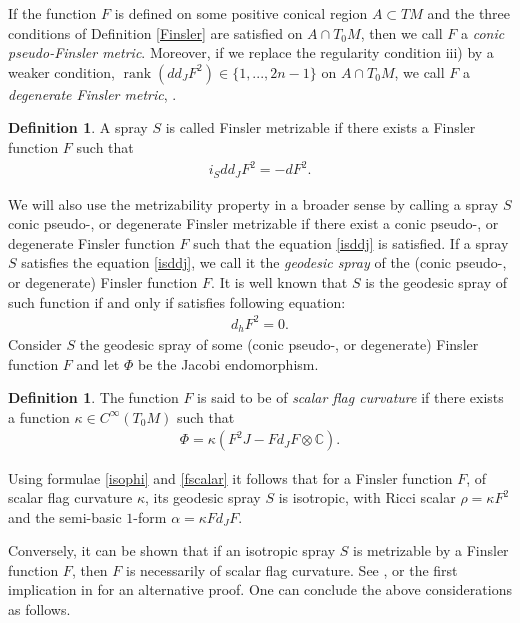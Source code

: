 \documentclass[oneside,english]{amsart}
\numberwithin{equation}{section}
\numberwithin{figure}{section}
\theoremstyle{plain}
\theoremstyle{plain}
\theoremstyle{definition}
\newtheorem{defn}[thm]{Definition}
\theoremstyle{plain}
\theoremstyle{plain}
\theoremstyle{plain}
\theoremstyle{remark}
\theoremstyle{remark}
\begin{document}
If the function $F$ is defined on some positive conical region $A\subset TM$
and the three conditions of Definition \ref{Finsler} are satisfied on $A\cap
T_0M$, then we call $F$ a \emph{conic pseudo-Finsler metric}. Moreover, if we
replace the regularity condition iii) by a weaker condition,
$\operatorname{rank}(dd_JF^2)\in \{1,..., 2n-1\}$ on $A\cap T_0M$, we call $F$
a \emph{degenerate Finsler metric}, \cite{JS12}.

\begin{defn} 
  \label{fmetr} 
  A spray $S$ is called Finsler metrizable if there exists a Finsler function
  $F$ such that
  \begin{eqnarray}
    i_Sdd_JF^2=-dF^2. \label{isddj}
  \end{eqnarray}
\end{defn}
We will also use the metrizability property in a broader sense by calling a
spray $S$ conic pseudo-, or degenerate Finsler metrizable if there exist a
conic pseudo-, or degenerate Finsler function $F$ such that the
equation \eqref{isddj} is satisfied. If a spray $S$ satisfies the equation \eqref{isddj}, we call it the
\emph{geodesic spray} of the (conic pseudo-, or degenerate) Finsler function
$F$. It is well known that $S$ is the geodesic spray of such function if and
only if satisfies following equation:
\begin{eqnarray}
  d_hF^2=0. 
  \label{gsf2}
\end{eqnarray}
Consider $S$ the geodesic spray of some (conic pseudo-, or degenerate)
Finsler function $F$ and let $\Phi$ be the Jacobi endomorphism.  
\begin{defn} The function $F$ is said to be of \emph{scalar flag
    curvature}  if there exists a function $\kappa \in
  C^{\infty}(T_0M)$ such that 
  \begin{eqnarray}
    \Phi = \kappa \left( F^2 J - Fd_J F\otimes
      \mathbb{C}\right). \label{fscalar} \end{eqnarray}
\end{defn}

Using formulae \eqref{isophi} and \eqref{fscalar} it follows that for a Finsler
function $F$, of scalar flag curvature $\kappa$, its geodesic spray $S$ is
isotropic, with Ricci scalar $\rho=\kappa F^2$ and the semi-basic
$1$-form $\alpha = \kappa F d_J F.$

Conversely, it can be shown that if an isotropic spray $S$ is metrizable by a
Finsler function $F$, then $F$ is necessarily of scalar flag curvature. See
\cite[Lemma 8.3.2]{Shen01}, or the first implication in \cite[Thm. 4.2]{BM13}
for an alternative proof. One can conclude the above considerations as
follows.
\end{document}
